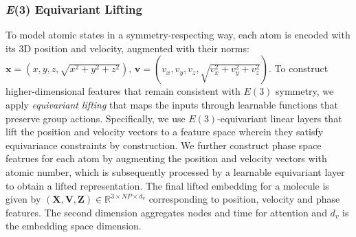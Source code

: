 \subsubsection{\textit{E}(3) Equivariant Lifting}
\label{sec:equivariant_lifting}
To model atomic states in a symmetry-respecting way, each atom is encoded with its 3D position and velocity, augmented with their norms: $\mathbf{x} = (x,y,z,\sqrt{x^2+y^2+z^2}), \, \mathbf{v} = (v_x, v_y, v_z, \sqrt{v_x^2+v_y^2+v_z^2})$.
To construct higher-dimensional features that remain consistent with $E(3)$ symmetry, we apply \textit{equivariant lifting} that maps the inputs through learnable functions that preserve group actions.
Specifically, we use \(E(3)\)-equivariant linear layers \cite{geiger_e3nn_2022} that lift the position and velocity vectors to a feature space
wherein they satisfy equivariance constraints by construction. We further construct phase space featrues for each atom by augmenting the position and velocity vectors with atomic number, which is subsequently processed by a learnable equivariant layer to obtain a lifted representation. The final lifted embedding for a molecule is given by $({\mathbf X}, {\mathbf{V}}, {\mathbf{Z}}) \in \mathbb R^{3 \times N P \times d_v}$ corresponding to position, velocity and phase features. The second dimension aggregates nodes and time for attention and $d_v$ is the embedding space dimension. 

